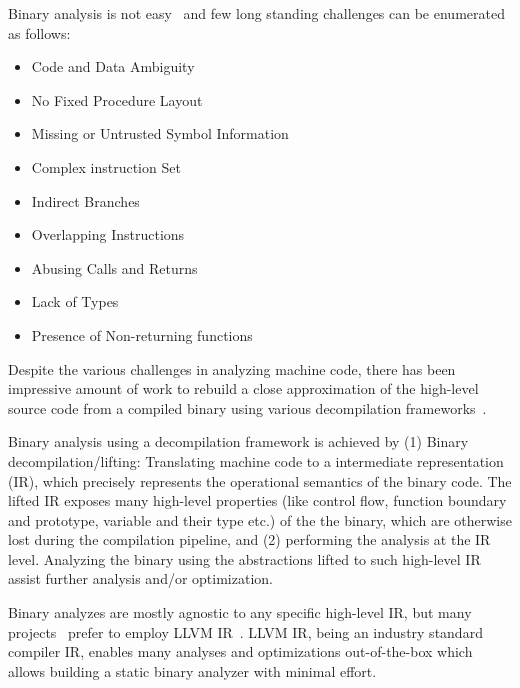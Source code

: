 Binary analysis is not easy~\cite{Meng:2016} and few long standing
challenges can be enumerated as follows:
\begin{itemize}
    \item Code and Data Ambiguity
    \item No Fixed Procedure Layout
    \item Missing or Untrusted Symbol Information
    \item Complex instruction Set
    \item Indirect Branches
    \item Overlapping Instructions
    \item Abusing Calls and Returns
    \item Lack of Types
    \item Presence of Non-returning functions
\end{itemize}

Despite the various challenges in analyzing machine code, there has been
impressive amount of work to rebuild a close approximation of the high-level
source code from a compiled binary using various decompilation
frameworks~\cite{McSema:Recon14,Remill,Angr1,BAP:CAV11,Radare2,FCD,BitBlaze:2008,hexray,Fokin:2011,eschulte2018bed,katz2018rnn,Schwartz:2013,IDA,mctoll,revgen}.

Binary analysis using a decompilation framework is achieved by (1) Binary
decompilation/lifting: Translating machine code to a intermediate
representation (IR), which precisely represents the operational semantics of
the binary code. The lifted IR exposes many high-level properties (like control
    flow, function boundary and prototype, variable and their type etc.) of the
the binary, which are otherwise lost during the compilation pipeline, and (2)
  performing the analysis at the IR level.  Analyzing the binary using the
  abstractions lifted to such high-level IR assist further analysis and/or
  optimization. 

Binary analyzes are mostly agnostic to any specific high-level IR, but many
projects~\cite{McSema:Recon14,Remill,FCD,reopt,mctoll} prefer to employ LLVM
IR~\cite{Lattner:2004}. LLVM IR, being an industry standard compiler IR,
  enables many analyses and optimizations out-of-the-box which allows building
  a static binary analyzer with minimal effort.

